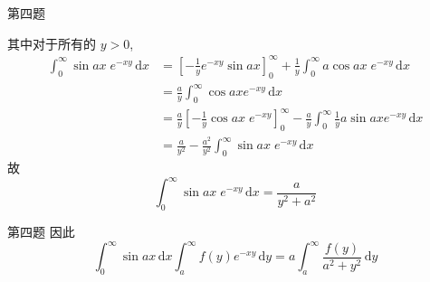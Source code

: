 \documentclass{beamer}
\begin{document}
\begin{frame}[fragile]{第四题}
  
其中对于所有的 \(  y> 0  \),   \[
  \begin{aligned}
  \int_{0}^{\infty}\sin ax  \;e^{-xy}\,\mathrm{d} x&= [-\frac{1 }{y }  e^{-xy}\sin  ax ]_{0}^{\infty}+ \frac{1 }{y } \int_{0}^{\infty}a\cos ax \; e^{-xy}\,\mathrm{d} x  \\ 
   &= \frac{a }{y }\int_{0}^{\infty}\cos axe^{-xy}\,\mathrm{d} x  \\ 
    &=   \frac{a }{y }[-\frac{1 }{y } \cos  ax\; e^{-xy} ]_{0}^{\infty} - \frac{a }{y }\int_{0}^{\infty}\frac{1 }{y }a\sin ax e^{-xy}\,\mathrm{d} x  \\ 
     &= \frac{a}{y^{2} }-\frac{a^{2} }{y^{2} } \int_{0}^{\infty}\sin ax\;e^{-xy}\,\mathrm{d} x  
  \end{aligned}
  \]故 \[
\int_{0}^{\infty}\sin ax\;e^{-xy}\,\mathrm{d} x= \frac{a }{y^{2}+ a^{2} } 
  \]
\end{frame}


\begin{frame}[fragile]{第四题}
 因此 \[
  \int_{0}^{\infty}\sin ax \,\mathrm{d} x\int_{a}^{\infty}f\left( y \right)e^{-xy}\,\mathrm{d} y=a \int_{a}^{\infty}\frac{f\left( y \right)  }{a^{2}+ y^{2} }\,\mathrm{d} y  
  \]
\end{frame}


\backmatter
\end{document}
